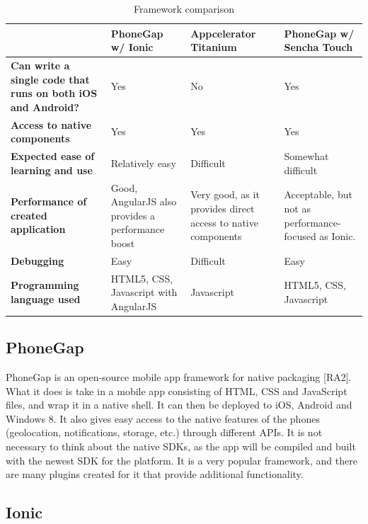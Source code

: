 \begin{table}[!h]
	\begin{center}
		\begin{tabular}{ | p{6cm} | p{3cm} | p{3cm} | p{4cm} |}
			\hline
			\textbf{} & \textbf{PhoneGap w/ Ionic} & \textbf{Appcelerator Titanium} & \textbf{PhoneGap w/ Sencha Touch} \\ \hline
			\textbf{Can write a single code that runs on both iOS and Android?} & Yes & No & Yes \\ \hline
			\textbf{Access to native components} & Yes & Yes & Yes \\ \hline
			\textbf{Expected ease of learning and use} & Relatively easy & Difficult & Somewhat difficult \\ \hline
			\textbf{Performance of created application} & Good, AngularJS also provides a performance boost & Very good, as it provides direct access to native components & Acceptable, but not as performance- focused as Ionic. \\ \hline
			\textbf{Debugging} & Easy & Difficult & Easy \\ \hline
			\textbf{Programming language used} & HTML5, CSS, Javascript with AngularJS & Javascript & HTML5, CSS, Javascript \\ \hline
		\end{tabular}
	\end{center}
	\caption{Framework comparison}
	\label{Tab_framework}
\end{table}

\subsection{PhoneGap}
\label{subsec_phonegap}

PhoneGap is an open-source mobile app framework for native packaging [RA2]. What it does is take in a mobile app consisting of HTML, CSS and JavaScript files, and wrap it in a native shell. It can then be deployed to iOS, Android and Windows 8. It also gives easy access to the native features of the phones (geolocation, notifications, storage, etc.) through different APIs. It is not necessary to think about the native SDKs, as the app will be compiled and built with the newest SDK for the platform.  It is a very popular framework, and there are many plugins created for it that provide additional functionality.

\subsection{Ionic}
\label{subsec_ionic}

